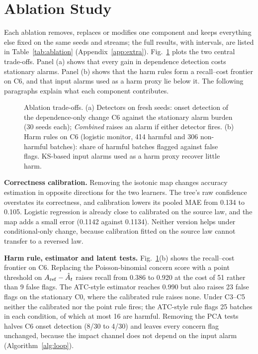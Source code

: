 \section{Ablation Study}
\label{sec:ablation}


Each ablation removes, replaces or modifies one component and keeps everything else
fixed on the same seeds and streams; the full results, with intervals, are listed in
Table~\ref{tab:ablation} (Appendix~\ref{app:extra}). Fig.~\ref{fig:ablation} plots the two central trade-offs. Panel (a)
shows that every gain in dependence detection costs stationary alarms. Panel (b)
shows that the harm rules form a recall--cost frontier on C6, and that input alarms
used as a harm proxy lie below it. The following paragraphs explain what each
component contributes.

\begin{figure}[t]
\centering
\resizebox{\columnwidth}{!}{}
\caption{Ablation trade-offs. (a) Detectors on fresh seeds: onset detection of the dependence-only change C6 against the stationary alarm burden (30 seeds each); \emph{Combined} raises an alarm if either detector fires. (b) Harm rules on C6 (logistic monitor, 414 harmful and 306 non-harmful batches): share of harmful batches flagged against false flags. KS-based input alarms used as a harm proxy recover little harm.}
\label{fig:ablation}
\end{figure}

\textbf{Correctness calibration.} Removing the isotonic map changes accuracy estimation
in opposite directions for the two learners. The tree's raw confidence overstates its
correctness, and calibration lowers its pooled MAE from 0.134 to 0.105. Logistic
regression is already close to calibrated on the source law, and the map adds a small
error (0.1142 against 0.1134). Neither version helps under conditional-only change,
because calibration fitted on the source law cannot transfer to a reversed law.

\textbf{Harm rule, estimator and latent tests.} Fig.~\ref{fig:ablation}(b) shows the
recall--cost frontier on C6. Replacing the Poisson-binomial concern score with a point
threshold on $A_{\mathrm{ref}}-\hat{A}_t$ raises recall from 0.386 to 0.920 at the cost of 51 rather
than 9 false flags. The ATC-style estimator reaches 0.990 but also raises 23 false
flags on the stationary C0, where the calibrated rule raises none. Under C3--C5 neither the
calibrated nor the point rule fires; the ATC-style rule flags 25 batches in each
condition, of which at most 16 are harmful. Removing the PCA tests halves C6 onset detection (8/30 to 4/30) and leaves every
concern flag unchanged, because the impact channel does not depend on the input alarm
(Algorithm~\ref{alg:loop}).

